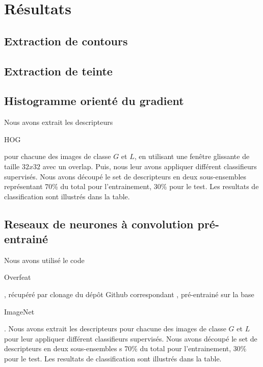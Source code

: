 \documentclass{book}
\begin{document}
\chapter{Résultats}
\section{Extraction de contours}
\section{Extraction de teinte}
\section{Histogramme orienté du gradient}
Nous avons extrait les descripteurs \begin{itshape}HOG\end{itshape} pour chacune des images de classe $G$ et $L$, en utilisant une fenêtre glissante de taille $32x32$ avec un overlap. Puis, nous 
leur avons appliquer différent classifieurs supervisés. Nous avons découpé le set de descripteurs en deux sous-ensembles représentant 70\% du total pour l'entrainement, 
30\% pour le test. Les resultats de classification sont illustrés dans la table.
\section{Reseaux de neurones à convolution pré-entrainé}
Nous avons utilisé le code \begin{itshape}Overfeat\end{itshape} \cite{DBLP:journals/corr/SermanetEZMFL13}, récupéré par clonage du dépôt 
Github correspondant \cite{overfeat}, pré-entrainé sur la base \begin{itshape}ImageNet\end{itshape} \cite{imagenet_cvpr09}.
Nous avons extrait les descripteurs pour chacune des images de classe $G$ et $L$ pour leur appliquer différent classifieurs
 supervisés. Nous avons découpé le set de descripteurs en deux sous-ensembles s 70\% du total pour l'entrainement, 30\% pour le test.
 Les resultats de classification sont illustrés dans la table.

\backmatter

\listoftables

\listoffigures



\end{document}
